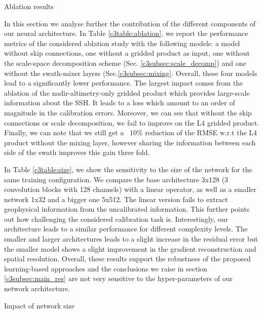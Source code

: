 \begin{bibunit}
\begin{table}[t]
\caption{Ablation results}
\label{c3table:ablation}
\end{table}


In this section we analyse further the contribution of the different components of our neural architecture. 
In Table \ref{c3table:ablation}, we report 
the performance metrics of the considered ablation study with the following models:
a model without skip connections, one without a gridded product as input, one without the scale-space decomposition scheme (Sec. \ref{c3subsec:scale_decomp}) and one without the swath-mixer layers (Sec.\ref{c3subsec:mixing}. Overall, these four models lead to a significantly lower performance. 
The largest impact comes from the ablation of the nadir-altimetry-only gridded product which provides large-scale information about the SSH. It leads to a loss which amount to an order of magnitude in the calibration errors.
Moreover, we can see that without the skip connections or scale decomposition, we fail to improve on the L4 gridded product.
Finally, we can note that we still get a ~10\% reduction of the RMSE w.r.t the L4 product without the mixing layer, however sharing the information between each side of the swath improves this gain three fold.

% 

In Table \ref{c3table:size}, we show the sensitivity to the size of the network for the same training configuration. We compare the base architecture 3x128 (3 convolution blocks with 128 channels) with a linear operator, as well as a smaller network 1x32 and a bigger one 5x512. The linear version fails to extract geophysical information from the uncalibrated information. This further points out how challenging the considered calibration task is. Interestingly, our architecture leads to a similar performance for different complexity levels. The smaller and larger architectures leads to a slight increase in the residual error but the smaller model shows a slight improvement in the gradient reconstruction and spatial resolution.
Overall, these results support the robustness of the proposed learning-based approaches and the conclusions we raise in section \ref{c3subsec:main_res} are not very sensitive to the hyper-parameters of our network architecture.
\begin{table}[t]
\begin{center}

\end{center}
\caption{Impact of network size}
\label{c3table:size}
\end{table}


\end{bibunit}
